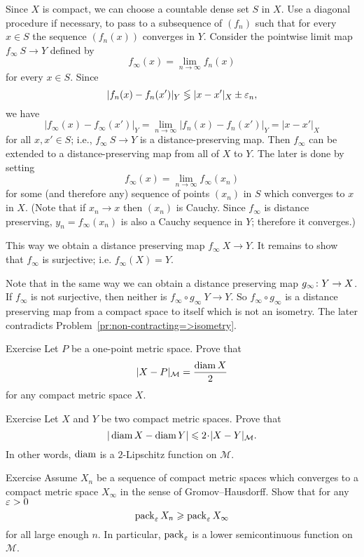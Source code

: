 Since $X$ is compact, 
we can choose a countable dense set
$S$ in $X$.
Use a diagonal procedure if necessary, to pass to a subsequence of $(f_n)$
such that for every $x \in S$ the sequence $(f_n(x))$ 
converges in $Y$. 
Consider the pointwise limit map  $f_\infty \: S \to Y$ defined by
 $$f_\infty(x) = \lim_{n\to\infty} f_n (x)$$ for every $x \in S$. 
Since $$|f_n (x)- f_n (x')|_Y\lege |x- x'|_X \pm\eps_n,$$ 
we have 
$$|f_\infty(x)-f_\infty (x')|_Y 
= \lim_{n\to\infty} |f_n(x)-f_n (x')|_Y 
= |x -x'|_X$$ for all
$x, x' \in S$; 
i.e., $f_\infty\:S\to Y$ is a distance-preserving map. 
Then $f_\infty$ can be extended to a distance-preserving map from all of $X$ to $Y$.
The later is done by setting 
$$f_\infty(x)=\lim_{n\to\infty} f_\infty(x_n)$$ 
for some (and therefore any) sequence of points $(x_n)$ in $S$
which converges to $x$ in $X$.
(Note that if $x_n\to x$ then $(x_n)$ is Cauchy.
Since $f_\infty$ is distance preserving, $y_n=f_\infty(x_n)$ is also a Cauchy sequence in $Y$;
therefore it converges.)

This way we obtain a distance preserving map $f_\infty\:X\to Y$. 
It remains to show that $f_\infty$ is surjective; i.e. $f_\infty(X)=Y$.

Note that in the same way we can obtain a distance preserving map $g_\infty\:Y\z\to X$.
If $f_\infty$ is not surjective, then neither is $f_\infty\circ g_\infty\:Y\to Y$.
So $f_\infty \circ g_\infty$ is a distance preserving map from a compact space to itself which is not an isometry.
The later contradicts Problem~\ref{pr:non-contracting=>isometry}. 
\qeds

\begin{thm}{Exercise}\label{ex:point-diam}
Let $P$ be a one-point metric space. 
Prove that 
$$|X-P |_{\mathcal{M}} = \frac{\operatorname{diam} X}2$$ for any compact metric space $X$.
\end{thm}

\begin{thm}{Exercise}\label{ex:d_GH-and-diam}
 Let $X$ and $Y$ be two compact metric spaces.
Prove that 
$$|\diam X - \diam Y |\le 2\cdot |X-Y|_{\mathcal{M}}.$$
In other words, $\operatorname{diam}$ is a $2$-Lipschitz function on $\mathcal{M}$.
\end{thm}

\begin{thm}{Exercise}\label{ex:pack-GH}
Assume $X_n$ be a sequence of compact metric spaces which converges to a compact metric space $X_\infty$
in the sense of Gromov--Hausdorff.
Show that for any $\varepsilon>0$
$$\operatorname{pack}_\varepsilon X_n\geqslant\operatorname{pack}_\varepsilon X_\infty$$ 
for all large enough $n$.
In particular, $\operatorname{pack}_\varepsilon$ is a lower semicontinuous function on $\mathcal{M}$.
\end{thm}


